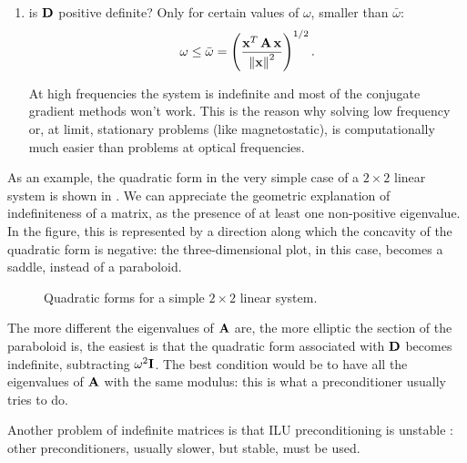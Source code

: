 \begin{enumerate}
\item is $\mathbf{D}$ positive definite? Only for certain values of $\omega$,
  smaller than $\bar{\omega}$:
  \begin{equation*}
    \omega \leq \bar{\omega} = \left(
    \frac{{{\mathbf{x}}^T\,{\mathbf{A}\,\mathbf{x}}}}{\left\lVert\mathbf{x}\right\rVert^2}
    \right)^{1/2}.
  \end{equation*}

  At high frequencies the system is indefinite and most of the
  conjugate gradient methods won't work. This is the reason why
  solving low frequency or, at limit, stationary problems (like
  magnetostatic), is computationally much easier than problems at
  optical frequencies.
\end{enumerate}

As an example, the quadratic form in the very
simple case of a $2 \times 2$ linear system is shown in
 \cite{shewchuk_cg}. We can appreciate the
geometric explanation of indefiniteness of a matrix, as the presence
of at least one non-positive eigenvalue. In the figure, this is
represented by a direction along which the concavity of the quadratic
form is negative: the three-dimensional plot, in this case, becomes a saddle,
instead of a paraboloid.

\begin{figure}[htbp]
  \begin{center}
  \end{center}
  \caption{Quadratic forms for a simple $2 \times 2$ linear system.}    
  \label{fig:quadratic_forms}
\end{figure}

The more different the eigenvalues of $\mathbf{A}$ are, the more elliptic the
section of the paraboloid is, the easiest is that the quadratic form
associated with $\mathbf{D}$ becomes indefinite, subtracting $\omega^2
\mathbf{I}$. The best
condition would be to have all the eigenvalues of $\mathbf{A}$ with the same
modulus: this is what a preconditioner usually tries to do.

Another problem of indefinite matrices is that ILU preconditioning is
unstable \cite{benzi_survey}: other preconditioners, usually slower,
but stable, must be used.

